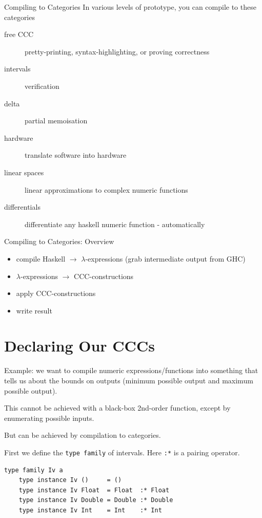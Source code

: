 \documentclass[10pt]{beamer}
\theoremstyle{definition}
\theoremstyle{remark}
\numberwithin{equation}{section}
\begin{document}
\begin{frame}[fragile]{Compiling to Categories}
  In various levels of prototype, you can compile to these categories
  \begin{description}
  \item[free CCC] pretty-printing, syntax-highlighting, or proving correctness
  \item[intervals] verification
  \item[delta] partial memoisation
  \item[hardware] translate software into hardware
  \item[linear spaces] linear approximations to complex numeric functions
  \item[differentials] differentiate any haskell numeric function - automatically
  \end{description}
\end{frame}

\begin{frame}[fragile]{Compiling to Categories: Overview}
  \begin{itemize}
  \item compile Haskell $\rightarrow$ $\lambda$-expressions (grab intermediate output from GHC)
  \item $\lambda$-expressions $\rightarrow$ CCC-constructions
  \item apply CCC-constructions
  \item write result
  \end{itemize}
\end{frame}

\section{Declaring Our CCCs}

\begin{frame}[fragile]{}
  Example: we want to compile numeric expressions/functions into something that tells us about the bounds on outputs (minimum possible output and maximum possible output).

  This cannot be achieved with a black-box 2nd-order function, except by enumerating possible inputs.

  But can be achieved by compilation to categories.
\end{frame}

\begin{frame}[fragile]{}
  First we define the \lstinline{type family} of intervals. Here \lstinline{:*} is a pairing operator.
  \begin{lstlisting}[frame=single]
    type family Iv a
    type instance Iv ()     = ()
    type instance Iv Float  = Float  :* Float
    type instance Iv Double = Double :* Double
    type instance Iv Int    = Int    :* Int
  \end{lstlisting}
\end{frame}
\end{document}
